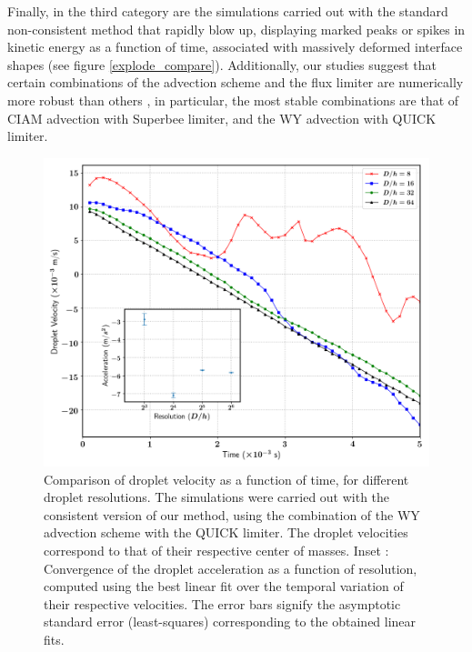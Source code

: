 Finally, in the third category are the simulations carried out with the standard 
non-consistent method that rapidly blow up, displaying marked peaks 
or spikes in kinetic energy as a function of time, 
associated with massively deformed interface shapes (see figure \ref{explode_compare}). 
Additionally, our studies suggest that certain combinations 
of the advection scheme and the flux limiter are 
numerically more robust than others
, in particular, the most stable combinations 
are that of CIAM advection with 
Superbee limiter, and the WY advection with QUICK limiter. 

\begin{figure}
\begin{center}
\includegraphics[width = 1.0\textwidth]{plots/raindrop/dropl_velocity_accel_ppd.png}
\end{center}
\vspace*{-0.5cm}
\caption{Comparison of droplet velocity as a function of time, 
for different droplet resolutions.
The simulations were carried out with the consistent version of our method,
using the combination of the WY advection scheme with the QUICK limiter. 
The droplet velocities correspond to that of their respective center of masses. 
Inset : Convergence of the droplet acceleration as a function of resolution, 
computed using the best linear fit over the temporal variation 
of their respective velocities. 
The error bars signify the asymptotic standard 
error (least-squares) corresponding to the obtained linear fits.} 
\label{drop_vel}
\end{figure}

